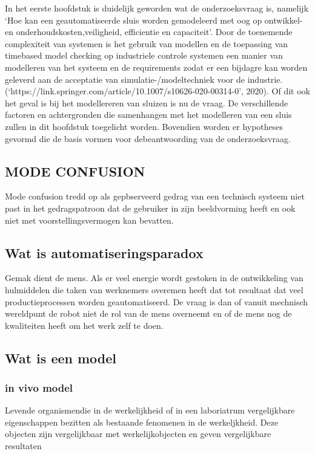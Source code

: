 
 




In het eerste hoofdstuk is duidelijk geworden wat de onderzoeksvraag is, namelijk ‘Hoe kan een geautomatiseerde sluis worden gemodeleerd met oog op ontwikkel- en onderhoudskosten,veiligheid, efficientie en capaciteit’. Door de toenemende complexiteit van systemen is het gebruik van modellen en de toepassing van timebased model checking  op industriele controle systemen een manier van modelleren van het systeem en de requirements zodat er een bijdagre kan worden geleverd aan de acceptatie van  simulatie-/modeltechniek voor de industrie.(‘https://link.springer.com/article/10.1007/s10626-020-00314-0’, 2020). Of dit ook het geval is bij het modellereren van sluizen is nu de vraag.
De verschillende factoren en achtergronden die  samenhangen met het modelleren van een sluis zullen in dit hoofdstuk toegelicht worden. Bovendien worden er hypotheses gevormd die de basis vormen voor debeantwoording van de onderzoeksvraag. 




\subsection{MODE CONFUSION }
Mode confusion tredd op als gepbserveerd gedrag van een technisch systeem niet past in het gedragspatroon dat de gebruiker in zijn beeldvorming heeft  en ook niet met voorstellingsvermogen kan bevatten.
\subsection{Wat is automatiseringsparadox}
Gemak dient de mens. Als er veel energie wordt gestoken in de ontwikkeling van hulmiddelen die taken van werknemers overemen heeft dat tot resultaat dat veel productieprocessen worden geautomatiseerd. De vraag is dan of vanuit mechnisch wereldpunt de robot niet de rol van de mens overneemt en of de mens nog de kwaliteiten heeft om het werk zelf te doen.
\cite{bicker21102016automatiseringsparadox }
\cite{vseautoparadox }
\cite{blogxot21112016slimapparaat }


\subsection{Wat is een model}

\subsubsection{in vivo model}
Levende organismendie in de werkelijkheid of in een laboriatrum vergelijkbare eigenschappen bezitten als bestaande fenomenen in de werkeljkheid. Deze objecten zijn vergelijkbaar met werkelijkobjecten en geven vergelijkbare resultaten
